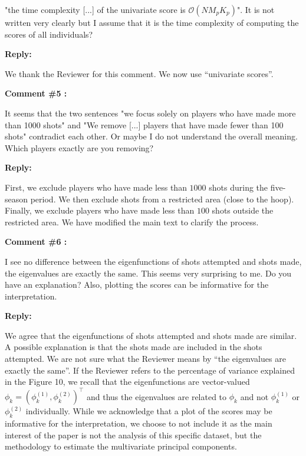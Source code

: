 \documentclass[11pt]{article}
\begin{document}
 "the time complexity [...] of the univariate score is $\mathcal{O}(NM_pK_p)$". It is not written very clearly but I assume that it is the time complexity of computing the scores of all individuals?


\medskip

\normalfont

\textbf{Reply:}

We thank the Reviewer for this comment. We now use ``univariate scores''.

\bigskip

\itshape



\textbf{Comment \#5 :}

It seems that the two sentences "we focus solely on players who have made more than 1000 shots" and "We remove [...] players that have made fewer than 100 shots" contradict each other. Or maybe I do not understand the overall meaning. Which players exactly are you removing?

\medskip

\normalfont

\textbf{Reply:}

First, we exclude players who have made less than $1000$ shots during the five-season period. We then exclude shots from a restricted area (close to the hoop). Finally, we exclude players who have made less than $100$ shots outside the restricted area. We have modified the main text to clarify the process.
\bigskip


\itshape

\textbf{Comment \#6 :}

I see no diﬀerence between the eigenfunctions of shots attempted and shots made, the eigenvalues are exactly the same. This seems very surprising to me. Do you have an explanation? Also, plotting the scores can be informative
for the interpretation.


\medskip

\normalfont

\textbf{Reply:}

We agree that the eigenfunctions of shots attempted and shots made are similar. A possible explanation is that the shots made are included in the shots attempted. We are not sure what the Reviewer means by ``the eigenvalues are exactly the same''. If the Reviewer refers to the percentage of variance explained in the Figure 10, we recall that the eigenfunctions are vector-valued $\phi_k = (\phi_k^{(1)}, \phi_k^{(2)})^\top$ and thus the eigenvalues are related to $\phi_k$ and not $\phi_k^{(1)}$ or $\phi_k^{(2)}$ individually. While we acknowledge that a plot of the scores may be informative for the interpretation, we choose to not include it as the main interest of the paper is not the analysis of this specific dataset, but the methodology to estimate the multivariate principal components.
\end{document}
